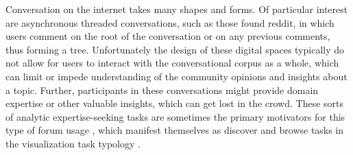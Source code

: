 \documentclass{egpubl}
\begin{document}
Conversation on the internet takes many shapes and forms. 
%
Of particular interest are asynchronous threaded conversations, such as those found reddit, in which users comment on the root of the conversation or on any previous comments, thus forming a tree. 
%
Unfortunately the design of these digital spaces typically do not allow for users to interact with the conversational corpus as a whole, which can limit or impede understanding of the community opinions and insights about a topic.
%
Further, participants in these conversations might provide domain expertise or other valuable insights, which can get lost in the crowd.
%
These sorts of analytic expertise-seeking tasks are sometimes the primary motivators for this type of forum usage \cite{barik2015heart, hoque2014convis}, which manifest themselves as discover and browse tasks in the visualization task typology \cite{brehmer2013multi}.
\end{document}
